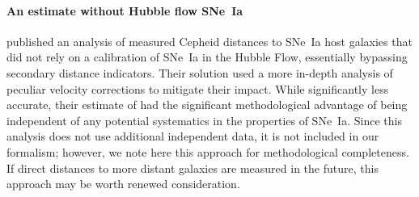 \paragraph {An {\Hcst} estimate without Hubble flow SNe~Ia}

\cite{2022ApJ...935...83K} published an analysis of measured Cepheid distances to SNe~Ia host galaxies that did not rely on a calibration of SNe~Ia in the Hubble Flow, essentially bypassing secondary distance indicators.  Their solution used a more in-depth analysis of peculiar velocity corrections to mitigate their impact.  While significantly less accurate, their estimate of {\Hcst} had the significant methodological advantage of being independent of any potential systematics in the properties of SNe~Ia.  Since this analysis does not use additional independent data, it is not included in our formalism; however, we note here this approach for methodological completeness.  If direct distances to more distant galaxies are measured in the future, this approach may be worth renewed consideration.

















